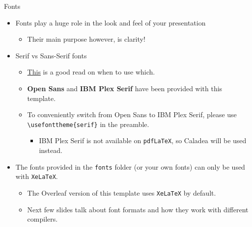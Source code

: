 \documentclass{beamer}
\newcommand{\hrefcol}[2]{\textcolor{uihteal}{\href{#1}{#2}}}
\begin{document}
\begin{frame}[fragile]{Fonts}
\begin{itemize}
\item Fonts play a huge role in the look and feel of your presentation
  \begin{itemize}
  \item Their main purpose however, is clarity!
  \end{itemize}
\item \textrm{Serif} vs \textsf{Sans-Serif} fonts
  \begin{itemize}
  \item \hrefcol{https://www.adobe.com/creativecloud/design/discover/serif-vs-sans-serif.html}{This} is a good read on when to use which.
  \item \textbf{Open Sans} and \textbf{IBM Plex Serif} have been provided with this template.
  \item To conveniently switch from Open Sans to IBM Plex Serif, please use \verb|\usefonttheme{serif}| in the preamble.
    \begin{itemize}
    \item IBM Plex Serif is not available on \verb|pdfLaTeX|, so Caladea will be used instead.
    \end{itemize}
  \end{itemize}
\item The fonts provided in the \verb|fonts| folder (or your own fonts) can only be used with \verb|XeLaTeX|.
    \begin{itemize}
    \item The Overleaf version of this template uses \verb|XeLaTeX| by default.
    \item Next few slides talk about font formats and how they work with different compilers.
    \end{itemize}
\end{itemize}
\end{frame}
\end{document}
